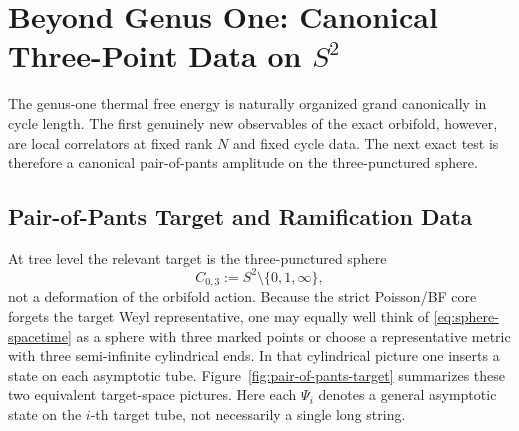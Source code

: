 \documentclass[11pt]{article}
\begin{document}
\section{Beyond Genus One: Canonical Three-Point Data on \texorpdfstring{$S^2$}{S2}}
The genus-one thermal free energy is naturally organized grand canonically in cycle length. The first genuinely new observables of the exact orbifold, however, are local correlators at fixed rank $N$ and fixed cycle data. The next exact test is therefore a canonical pair-of-pants amplitude on the three-punctured sphere.

\subsection{Pair-of-Pants Target and Ramification Data}

At tree level the relevant target is the three-punctured sphere
\begin{equation}\label{eq:sphere-spacetime}
C_{0,3}:=S^2\setminus\{0,1,\infty\},
\end{equation}
not a deformation of the orbifold action. Because the strict Poisson/BF core forgets the target Weyl representative, one may equally well think of \eqref{eq:sphere-spacetime} as a sphere with three marked points or choose a representative metric with three semi-infinite cylindrical ends. In that cylindrical picture one inserts a state on each asymptotic tube.
Figure~\ref{fig:pair-of-pants-target} summarizes these two equivalent target-space pictures. Here each $\Psi_i$ denotes a general asymptotic state on the $i$-th target tube, not necessarily a single long string.
\end{document}
